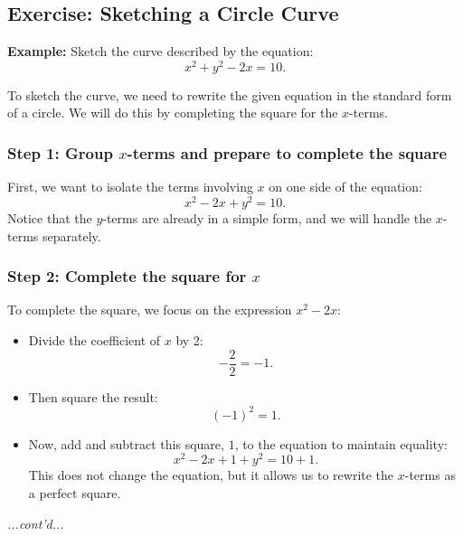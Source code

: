 \documentclass{article}
\begin{document}
\subsection*{Exercise: Sketching a Circle Curve}
\begin{exercisebox}
    \textbf{Example:} Sketch the curve described by the equation:
    \[
        x^2 + y^2 - 2x = 10.
    \]
    
    \begin{solutionbox}
    To sketch the curve, we need to rewrite the given equation in the standard form of a circle. We will do this by completing the square for the \(x\)-terms.

    \subsubsection*{Step 1: Group \(x\)-terms and prepare to complete the square}
    First, we want to isolate the terms involving \(x\) on one side of the equation:
    \[
        x^2 - 2x + y^2 = 10.
    \]
    Notice that the \(y\)-terms are already in a simple form, and we will handle the \(x\)-terms separately.

    \subsubsection*{Step 2: Complete the square for \(x\)}
    To complete the square, we focus on the expression \(x^2 - 2x\):
    \begin{itemize}
        \item Divide the coefficient of \(x\) by 2: 
        \[
            -\frac{2}{2} = -1.
        \]
        \item Then square the result:
        \[
            (-1)^2 = 1.
        \]
        \item Now, add and subtract this square, \(1\), to the equation to maintain equality:
        \[
            x^2 - 2x + 1 + y^2 = 10 + 1.
        \]
        This does not change the equation, but it allows us to rewrite the \(x\)-terms as a perfect square.
    \end{itemize}
    \end{solutionbox}
    \textit{...cont'd...}
\end{exercisebox}
\end{document}
